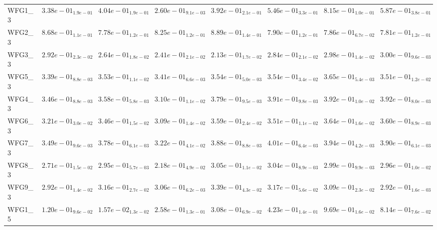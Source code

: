 \documentclass{article}
\begin{document}
\begin{table}
\begin{scriptsize}
\begin{tabular}{llllllll}
WFG1\_3 & $  3.38e-01_{ 1.9e-01}$ & $  4.04e-01_{ 1.9e-01}$ & $  2.60e-01_{ 9.1e-03}$ & $  3.92e-01_{ 2.1e-01}$ & $  5.46e-01_{ 3.3e-01}$ & \cellcolor{gray95}$  8.15e-01_{ 1.0e-01}$ & \cellcolor{gray25}$  5.87e-01_{ 3.8e-01}$ \\
WFG2\_3 & \cellcolor{gray25}$  8.68e-01_{ 1.1e-01}$ & $  7.78e-01_{ 1.2e-01}$ & $  8.25e-01_{ 1.2e-01}$ & \cellcolor{gray95}$  8.89e-01_{ 1.4e-01}$ & $  7.90e-01_{ 1.2e-01}$ & $  7.86e-01_{ 6.7e-02}$ & $  7.81e-01_{ 1.2e-01}$ \\
WFG3\_3 & $  2.92e-01_{ 2.3e-02}$ & $  2.64e-01_{ 1.8e-02}$ & $  2.41e-01_{ 2.1e-02}$ & $  2.13e-01_{ 1.7e-02}$ & $  2.84e-01_{ 2.1e-02}$ & \cellcolor{gray25}$  2.98e-01_{ 1.4e-02}$ & \cellcolor{gray95}$  3.00e-01_{ 9.6e-03}$ \\
WFG5\_3 & $  3.39e-01_{ 8.8e-03}$ & $  3.53e-01_{ 1.1e-02}$ & $  3.41e-01_{ 6.6e-03}$ & $  3.54e-01_{ 5.0e-03}$ & \cellcolor{gray25}$  3.54e-01_{ 3.4e-02}$ & \cellcolor{gray95}$  3.65e-01_{ 5.4e-03}$ & $  3.51e-01_{ 1.2e-02}$ \\
WFG4\_3 & $  3.46e-01_{ 8.8e-03}$ & $  3.58e-01_{ 5.8e-03}$ & $  3.10e-01_{ 1.1e-02}$ & $  3.79e-01_{ 9.5e-03}$ & $  3.91e-01_{ 9.8e-03}$ & \cellcolor{gray95}$  3.92e-01_{ 1.0e-02}$ & \cellcolor{gray25}$  3.92e-01_{ 8.0e-03}$ \\
WFG6\_3 & $  3.21e-01_{ 3.0e-02}$ & $  3.46e-01_{ 1.5e-02}$ & $  3.09e-01_{ 1.4e-02}$ & $  3.59e-01_{ 2.4e-02}$ & $  3.51e-01_{ 1.1e-02}$ & \cellcolor{gray95}$  3.64e-01_{ 1.6e-02}$ & \cellcolor{gray25}$  3.60e-01_{ 8.9e-03}$ \\
WFG7\_3 & $  3.49e-01_{ 9.6e-03}$ & $  3.78e-01_{ 6.1e-03}$ & $  3.22e-01_{ 4.1e-02}$ & $  3.88e-01_{ 8.8e-03}$ & \cellcolor{gray95}$  4.01e-01_{ 6.4e-03}$ & \cellcolor{gray25}$  3.94e-01_{ 4.2e-03}$ & $  3.90e-01_{ 6.1e-03}$ \\
WFG8\_3 & $  2.71e-01_{ 1.5e-02}$ & $  2.95e-01_{ 5.7e-03}$ & $  2.18e-01_{ 4.9e-02}$ & \cellcolor{gray95}$  3.05e-01_{ 1.1e-02}$ & \cellcolor{gray25}$  3.04e-01_{ 8.9e-03}$ & $  2.99e-01_{ 9.9e-03}$ & $  2.96e-01_{ 1.0e-02}$ \\
WFG9\_3 & $  2.92e-01_{ 1.4e-02}$ & $  3.16e-01_{ 2.7e-02}$ & $  3.06e-01_{ 6.2e-03}$ & \cellcolor{gray95}$  3.39e-01_{ 4.3e-02}$ & \cellcolor{gray25}$  3.17e-01_{ 5.6e-02}$ & $  3.09e-01_{ 2.3e-02}$ & $  2.92e-01_{ 1.6e-03}$ \\
WFG1\_5 & $  1.20e-01_{ 9.6e-02}$ & $  1.57e-02_{ 1.3e-02}$ & $  2.58e-01_{ 1.3e-01}$ & $  3.08e-01_{ 6.9e-02}$ & $  4.23e-01_{ 1.4e-01}$ & \cellcolor{gray95}$  9.69e-01_{ 1.6e-02}$ & \cellcolor{gray25}$  8.14e-01_{ 7.6e-02}$ \\

\end{tabular}
\end{scriptsize}
\end{table}
\end{document}
